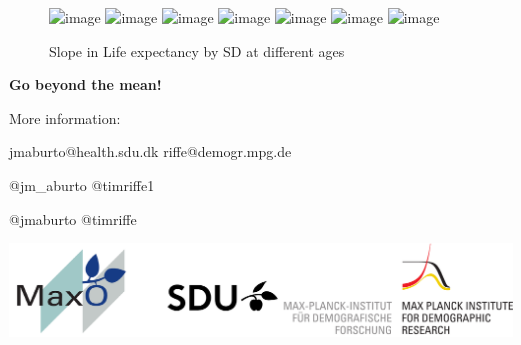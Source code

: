 \documentclass[xcolor={dvipsnames}]{beamer}
\begin{document}
\begin{frame}
		
			\begin{center}		
				\end{center}
			
\end{frame}

\begin{frame}
	\begin{figure}
		\centering		
		\caption{Slope in Life expectancy by SD at different ages}
		\includegraphics<1>[scale=.5]{Figures/Fig6}
		\includegraphics<2>[scale=.5]{Figures/Fig7}
		\includegraphics<3>[scale=.5]{Figures/Fig8}
		\includegraphics<4>[scale=.5]{Figures/Fig9}
		\includegraphics<5>[scale=.5]{Figures/Fig10}
		\includegraphics<6>[scale=.5]{Figures/Fig11}
		\includegraphics<7>[scale=.5]{Figures/Fig12}
	\end{figure}
\end{frame}



\begin{frame}
 \begin{center}
	\begin{center}
	\Large{
	 \textbf{Go beyond the mean!}}
	\end{center}
	
	\bigskip
	\bigskip
More information: 

jmaburto@health.sdu.dk \quad riffe@demogr.mpg.de

\faTwitter \quad  @jm\_aburto \quad @timriffe1


\faGithub \quad @jmaburto \quad @timriffe

\includegraphics[scale=0.2]{Figures/logos.pdf}    

\end{center}
 
 

\end{frame}
\end{document}
